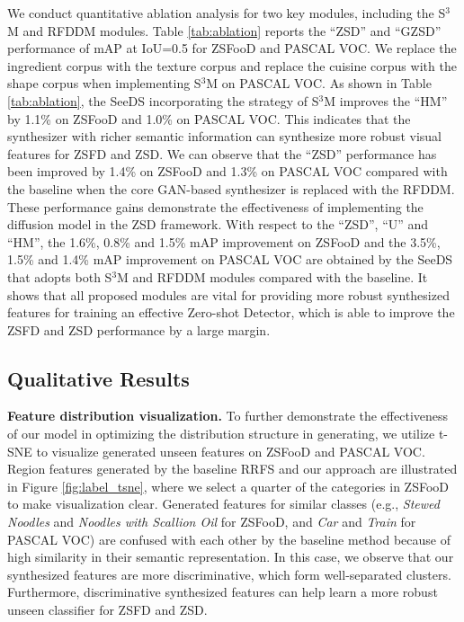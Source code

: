 We conduct quantitative ablation analysis for two key modules, including the S$^3$M and RFDDM modules. Table \ref{tab:ablation} reports the ``ZSD'' and ``GZSD'' performance of mAP at IoU=0.5 for ZSFooD and PASCAL VOC. We replace the ingredient corpus with the texture corpus and replace the cuisine corpus with the shape corpus when implementing S$^3$M on PASCAL VOC. As shown in Table \ref{tab:ablation}, the SeeDS incorporating the strategy of S$^3$M improves the ``HM'' by 1.1\% on ZSFooD and 1.0\% on PASCAL VOC. This indicates that the synthesizer with richer semantic information can synthesize more robust visual features for ZSFD and ZSD. We can observe that the ``ZSD'' performance has been improved by 1.4\% on ZSFooD and 1.3\% on PASCAL VOC compared with the baseline when the core GAN-based synthesizer is replaced with the RFDDM. These performance gains demonstrate the effectiveness of implementing the diffusion model in the ZSD framework. With respect to the ``ZSD'', ``U'' and ``HM'', the 1.6\%, 0.8\% and 1.5\% mAP improvement on ZSFooD and the 3.5\%, 1.5\% and 1.4\% mAP improvement on PASCAL VOC are obtained by the SeeDS that adopts both S$^3$M and RFDDM modules compared with the baseline. It shows that all proposed modules are vital for providing more robust synthesized features for training an effective Zero-shot Detector, which is able to improve the ZSFD and ZSD performance by a large margin.

\subsection{Qualitative Results}
\label{sec:qualitative}

\noindent\textbf{Feature distribution visualization.}
To further demonstrate the effectiveness of our model in optimizing the distribution structure in generating, we utilize t-SNE \cite{van2008visualizing} to visualize generated unseen features on ZSFooD and PASCAL VOC. Region features generated by the baseline RRFS and our approach are illustrated in Figure \ref{fig:label_tsne}, where we select a quarter of the categories in ZSFooD to make visualization clear. Generated features for similar classes (e.g., \emph{Stewed Noodles} and \emph{Noodles with Scallion Oil} for ZSFooD, and \emph{Car} and \emph{Train} for PASCAL VOC) are confused with each other by the baseline method because of high similarity in their semantic representation. In this case, we observe that our synthesized features are more discriminative, which form well-separated clusters. Furthermore, discriminative synthesized features can help learn a more robust unseen classifier for ZSFD and ZSD.

